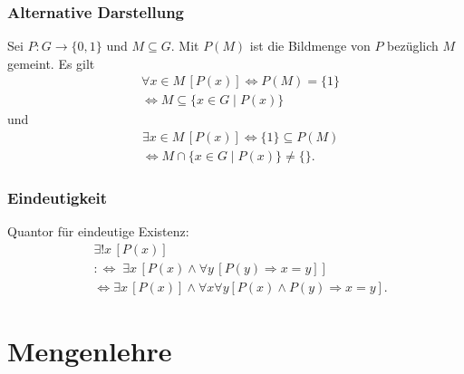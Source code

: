 \subsubsection{Alternative Darstellung}
Sei $P\colon G\to\{0,1\}$ und $M\subseteq G$.
Mit $P(M)$ ist die Bildmenge von $P$ bezüglich $M$ gemeint.
Es gilt
\begin{equation}
\begin{split}
&\forall x{\in}M\,[P(x)] \iff P(M)=\{1\}\\
& \iff M\subseteq\{x{\in}G\mid P(x)\}
\end{split}
\end{equation}
und
\begin{equation}
\begin{split}
& \exists x{\in}M\,[P(x)] \iff \{1\}\subseteq P(M)\\
& \iff M\cap\{x{\in}G\mid P(x)\}\ne\{\}.
\end{split}
\end{equation}

\subsubsection{Eindeutigkeit}
Quantor für eindeutige Existenz:
\begin{equation}
\begin{split}
&\exists!x\,[P(x)]\\
&:\Longleftrightarrow\; \exists x\,[P(x)\land \forall y\,[P(y)\Rightarrow x=y]]\\
&\iff \exists x\,[P(x)]\land \forall x\forall y[P(x)\land P(y)\Rightarrow x=y].
\end{split}
\end{equation}

\newpage
\section{Mengenlehre}
